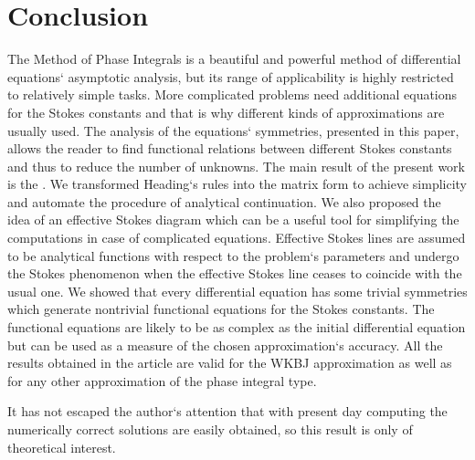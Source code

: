 \documentclass[12pt]{iopart}
\begin{document}

\section{Conclusion \label{sec:cnclsns}}

The Method of Phase Integrals is a beautiful and powerful method of differential equations` asymptotic analysis, but its range of applicability is highly restricted to relatively simple tasks. More complicated problems need additional equations for the Stokes constants and that is why different kinds of approximations \cite{white,ours} are usually used. The analysis of the equations` symmetries, presented in this paper, allows the reader to find functional relations between different Stokes constants and thus to reduce the number of unknowns. The main result of the present work is the . We transformed Heading`s rules \cite{heading,white} into the matrix form to achieve simplicity and automate the procedure of analytical continuation. We also proposed the idea of an effective Stokes diagram which can be a useful tool for simplifying the computations in case of complicated equations. Effective Stokes lines are assumed to be analytical functions with respect to the problem`s parameters and undergo the Stokes phenomenon when the effective Stokes line ceases to coincide with the usual one. We showed that every differential equation has some trivial symmetries which generate nontrivial functional equations for the Stokes constants. The functional equations are likely to be as complex as the initial differential equation but can be used as a measure of the chosen approximation`s accuracy. All the results obtained in the article are valid for the WKBJ approximation as well as for any other approximation of the phase integral type.

It has not escaped the author`s attention that with present day computing the numerically correct solutions are easily obtained, so this result is only of theoretical interest.

\end{document}
